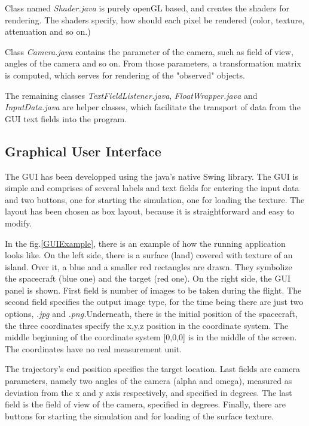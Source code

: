 \documentclass[english,12pt,a4paper,pdftex,elec,utf8]{aaltothesis}
\begin{document}
Class named \textit{Shader.java} is purely openGL based, and creates the shaders for rendering. The shaders specify, how should each pixel be rendered (color, texture, attenuation and so on.)

Class \textit{Camera.java} contains the parameter of the camera, such as field of view, angles of the camera and so on. From those parameters, a transformation matrix is computed, which serves for rendering of the "observed" objects.

The remaining classes \textit{TextFieldListener.java}, \textit{FloatWrapper.java} and \textit{InputData.java} are helper classes, which facilitate the transport of data from the GUI text fields into the program.

\subsection*{Graphical User Interface}

The GUI has been developped using the java's native Swing library. The GUI is simple and comprises of several labels and text fields for entering the input data and two buttons, one for starting the simulation, one for loading the texture. The layout has been chosen as box layout, because it is straightforward and easy to modify.

In the fig.\ref{GUIExample}, there is an example of how the running application looks like. On the left side, there is a surface (land) covered with texture of an island. Over it, a blue and a smaller red rectangles are drawn. They symbolize the spacecraft (blue one) and the target (red one). On the right side, the GUI panel is shown. First field is number of images to be taken during the flight. The second field specifies the output image type, for the time being there are just two options, \textit{.jpg} and \textit{.png.}Underneath, there is the initial position of the spacecraft, the three coordinates specify the x,y,z position in the coordinate system. The middle beginning of the coordinate system [0,0,0] is in the middle of the screen. The coordinates have no real measurement unit.

The trajectory's end position specifies the target location. Last fields are camera parameters, namely two angles of the camera (alpha and omega), measured as deviation from the x and y axis respectively, and specified in degrees. The last field is the field of view of the camera, specified in degrees. Finally, there are buttons for starting the simulation and for loading of the surface texture.
\end{document}
